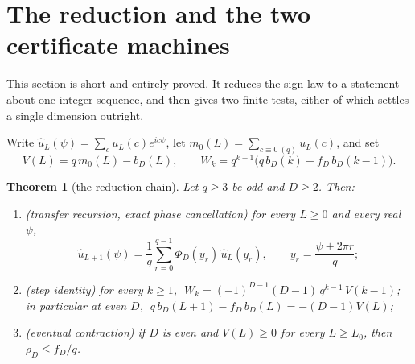 \documentclass[11pt]{amsart}
\newtheorem{theorem}{Theorem}[section]
\theoremstyle{definition}
\theoremstyle{remark}
\begin{document}

\section{The reduction and the two certificate machines}
\label{sec:certs}

This section is short and entirely proved. It reduces the sign law to a statement about one integer sequence, and then gives two finite tests, either of which settles a single dimension outright.

Write $\hat u_L(\psi) = \sum_c u_L(c)e^{ic\psi}$, let $m_0(L) = \sum_{c \equiv 0 \ (q)}u_L(c)$, and set
\[
  V(L) = q\,m_0(L) - b_D(L), \qquad W_k = q^{k-1}\bigl(q\,b_D(k) - f_D\,b_D(k-1)\bigr).
\]

\begin{theorem}[the reduction chain]
\label{thm:reduction}
Let $q \ge 3$ be odd and $D \ge 2$. Then:
\begin{enumerate}
\item[(i)] \emph{(transfer recursion, exact phase cancellation)} for every $L \ge 0$ and every real $\psi$,
\[
  \hat u_{L+1}(\psi) = \frac1q\sum_{r=0}^{q-1}\Phi_D(y_r)\,\hat u_L(y_r), \qquad y_r = \frac{\psi + 2\pi r}{q};
\]
\item[(ii)] \emph{(step identity)} for every $k \ge 1$, $\;W_k = (-1)^{D-1}(D-1)\,q^{k-1}\,V(k-1)$; in particular at even $D$, $\;q\,b_D(L+1) - f_D\,b_D(L) = -(D-1)V(L)$;
\item[(iii)] \emph{(eventual contraction)} if $D$ is even and $V(L) \ge 0$ for every $L \ge L_0$, then $\rho_D \le f_D/q$.
\end{enumerate}
\end{theorem}
\end{document}
